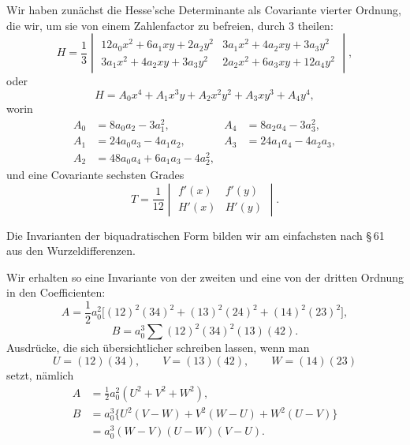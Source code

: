 \documentclass[11pt]{article}
\begin{document}
Wir haben zunächst die Hesse'sche Determinante als Covariante vierter Ordnung, die wir, um sie von einem Zahlenfactor zu befreien, durch $3$ theilen:
\begin{equation}
 H=\frac13
 \begin{vmatrix}
 12a_0x^2+6a_1xy+2a_2y^2 & 3a_1x^2+4a_2xy+3a_3y^2\\
 3a_1x^2+4a_2xy+3a_3y^2 & 2a_2x^2+6a_3xy+12a_4y^2
 \end{vmatrix},
\tag{2}
\end{equation}
oder
\[
 H=A_0x^4+A_1x^3y+A_2x^2y^2+A_3xy^3+A_4y^4,
\]
worin
\[
\begin{aligned}
 A_0&=8a_0a_2-3a_1^2,& A_4&=8a_2a_4-3a_3^2,\\
 A_1&=24a_0a_3-4a_1a_2,& A_3&=24a_1a_4-4a_2a_3,\\
 A_2&=48a_0a_4+6a_1a_3-4a_2^2,
\end{aligned}
\]
und eine Covariante sechsten Grades
\begin{equation}
 T=\frac{1}{12}
 \begin{vmatrix}
 f'(x)&f'(y)\\
 H'(x)&H'(y)
 \end{vmatrix}.
\tag{3}
\end{equation}

Die Invarianten der biquadratischen Form bilden wir am einfachsten nach \S\,61 aus den Wurzeldifferenzen.

Wir erhalten so eine Invariante von der zweiten und eine von der dritten Ordnung in den Coefficienten:
\begin{equation}
 A=\frac12 a_0^2\bigl[(12)^2(34)^2+(13)^2(24)^2+(14)^2(23)^2\bigr],
\tag{4}
\end{equation}
\begin{equation}
 B=a_0^3\sum(12)^2(34)^2(13)(42).
\tag{5}
\end{equation}
Ausdrücke, die sich übersichtlicher schreiben lassen, wenn man
\begin{equation}
 U=(12)(34),\qquad V=(13)(42),\qquad W=(14)(23)
\tag{6}
\end{equation}
setzt, nämlich
\begin{equation}
\begin{aligned}
 A&=\frac12 a_0^2(U^2+V^2+W^2),\\
 B&=a_0^3\{U^2(V-W)+V^2(W-U)+W^2(U-V)\}\\
  &=a_0^3(W-V)(U-W)(V-U).
\end{aligned}
\tag{7}
\end{equation}
\end{document}
